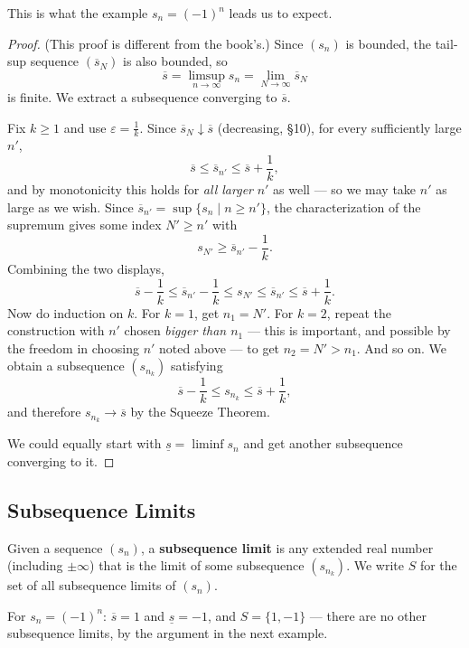 \documentclass[11pt]{report}
\begin{document}
This is what the example $s_n = (-1)^n$ leads us to expect.

\begin{proof}
(This proof is different from the book's.) Since $(s_n)$ is bounded, the tail-sup sequence $(\overline{s}_N)$ is also bounded, so
\[
\overline{s} = \limsup_{n\to\infty} s_n = \lim_{N\to\infty} \overline{s}_N
\]
is finite. We extract a subsequence converging to $\overline{s}$.

Fix $k \geq 1$ and use $\varepsilon = \tfrac1k$. Since $\overline{s}_N \downarrow \overline{s}$ (decreasing, \S 10), for every sufficiently large $n'$,
\[
\overline{s} \leq \overline{s}_{n'} \leq \overline{s} + \frac1k,
\]
and by monotonicity this holds for \emph{all larger} $n'$ as well --- so we may take $n'$ as large as we wish. Since $\overline{s}_{n'} = \sup\{s_n \mid n \geq n'\}$, the characterization of the supremum gives some index $N' \geq n'$ with
\[
s_{N'} \geq \overline{s}_{n'} - \frac1k.
\]
Combining the two displays,
\[
\overline{s} - \frac1k \leq \overline{s}_{n'} - \frac1k \leq s_{N'} \leq \overline{s}_{n'} \leq \overline{s} + \frac1k.
\]
Now do induction on $k$. For $k = 1$, get $n_1 = N'$. For $k = 2$, repeat the construction with $n'$ chosen \emph{bigger than $n_1$} --- this is important, and possible by the freedom in choosing $n'$ noted above --- to get $n_2 = N' > n_1$. And so on. We obtain a subsequence $(s_{n_k})$ satisfying
\[
\overline{s} - \frac1k \leq s_{n_k} \leq \overline{s} + \frac1k,
\]
and therefore $s_{n_k} \to \overline{s}$ by the Squeeze Theorem.

We could equally start with $\underline{s} = \liminf s_n$ and get another subsequence converging to it.
\end{proof}

\subsection{Subsequence Limits}

\begin{defbox}
Given a sequence $(s_n)$, a \textbf{subsequence limit} is any extended real number (including $\pm\infty$) that is the limit of some subsequence $(s_{n_k})$. We write $S$ for the set of all subsequence limits of $(s_n)$.
\end{defbox}

\begin{exbox}
For $s_n = (-1)^n$: $\overline{s} = 1$ and $\underline{s} = -1$, and $S = \{1, -1\}$ --- there are no other subsequence limits, by the argument in the next example.
\end{exbox}
\end{document}
